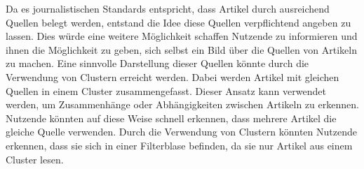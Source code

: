 Da es journalistischen Standards entspricht, dass Artikel durch ausreichend Quellen belegt werden, entstand die Idee diese Quellen verpflichtend angeben zu lassen.
Dies würde eine weitere Möglichkeit schaffen Nutzende zu informieren und ihnen die Möglichkeit zu geben, sich selbst ein Bild über die Quellen von Artikeln zu machen.
Eine sinnvolle Darstellung dieser Quellen könnte durch die Verwendung von Clustern erreicht werden.
Dabei werden Artikel mit gleichen Quellen in einem Cluster zusammengefasst.
Dieser Ansatz kann verwendet werden, um Zusammenhänge oder Abhängigkeiten zwischen Artikeln zu erkennen.
Nutzende könnten auf diese Weise schnell erkennen, dass mehrere Artikel die gleiche Quelle verwenden.
Durch die Verwendung von Clustern könnten Nutzende erkennen, dass sie sich in einer Filterblase befinden, da sie nur Artikel aus einem Cluster lesen.
